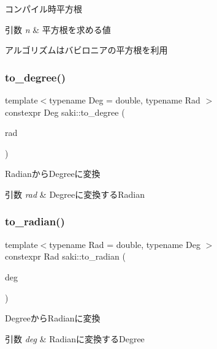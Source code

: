 コンパイル時平方根 


\begin{DoxyParams}{引数}
{\em n} & 平方根を求める値\\
\hline
\end{DoxyParams}
アルゴリズムはバビロニアの平方根を利用 \mbox{\label{namespacesaki_aa28ebe642bd2c0e608e2a61c34b3d7a5}} 
\subsubsection{\texorpdfstring{to\+\_\+degree()}{to\_degree()}}
{\footnotesize\ttfamily template$<$typename Deg  = double, typename Rad $>$ \\
constexpr Deg saki\+::to\+\_\+degree (\begin{DoxyParamCaption}\item[{Rad}]{rad }\end{DoxyParamCaption})}



Radianから\+Degreeに変換 


\begin{DoxyParams}{引数}
{\em rad} & Degreeに変換する\+Radian \\
\hline
\end{DoxyParams}
\mbox{\label{namespacesaki_aae246ec576e9e2da23c0c142e6fc4d6a}} 
\subsubsection{\texorpdfstring{to\+\_\+radian()}{to\_radian()}}
{\footnotesize\ttfamily template$<$typename Rad  = double, typename Deg $>$ \\
constexpr Rad saki\+::to\+\_\+radian (\begin{DoxyParamCaption}\item[{Deg}]{deg }\end{DoxyParamCaption})}



Degreeから\+Radianに変換 


\begin{DoxyParams}{引数}
{\em deg} & Radianに変換する\+Degree \\
\hline
\end{DoxyParams}


